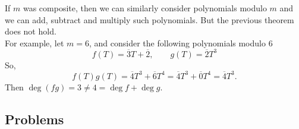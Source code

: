 
\begin{remark}
If $m$ was composite, then we can similarly consider polynomials modulo $m$ and we can add, subtract and multiply such polynomials. But the previous theorem does not hold.\\[0.5em]
For example, let $m = 6$, and consider the following polynomials modulo $6$
\[f(T) = \overline{3}T + \overline{2},\qquad g(T) = \overline{2}T^3\]
So, \[f(T)g(T) = \overline{4}T^3 + \overline{6}T^4 = \overline{4}T^3 + \overline{0}T^4 = \overline{4}T^3.\] Then $\deg (fg) = 3 \neq 4 = \deg f + \deg g$.
\end{remark}

\vspace*{0.5in}

\subsection{Problems}
\vspace{0.1in}

